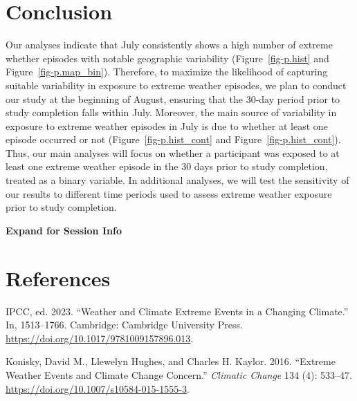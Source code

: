 \documentclass[
  letterpaper,
  DIV=11,
  numbers=noendperiod]{scrartcl}
\newlength{\cslhangindent}
\newenvironment{CSLReferences}[2] %
 {\begin{list}{}{%
  \setlength{\itemindent}{0pt}
  \setlength{\leftmargin}{0pt}
  \setlength{\parsep}{0pt}
  \ifodd #1
   \setlength{\leftmargin}{\cslhangindent}
   \setlength{\itemindent}{-1\cslhangindent}
  \fi
  \setlength{\itemsep}{#2\baselineskip}}}
 {\end{list}}
\begin{document}
\section{Conclusion}\label{conclusion}

Our analyses indicate that July consistently shows a high number of
extreme whether episodes with notable geographic variability
(Figure~\ref{fig-p.hist} and Figure~\ref{fig-p.map_bin}). Therefore, to
maximize the likelihood of capturing suitable variability in exposure to
extreme weather episodes, we plan to conduct our study at the beginning
of August, ensuring that the 30-day period prior to study completion
falls within July. Moreover, the main source of variability in exposure
to extreme weather episodes in July is due to whether at least one
episode occurred or not (Figure~\ref{fig-p.hist_cont} and
Figure~\ref{fig-p.hist_cont}). Thus, our main analyses will focus on
whether a participant was exposed to at least one extreme weather
episode in the 30 days prior to study completion, treated as a binary
variable. In additional analyses, we will test the sensitivity of our
results to different time periods used to assess extreme weather
exposure prior to study completion.

\begin{tcolorbox}[enhanced jigsaw, left=2mm, colback=white, leftrule=.75mm, opacityback=0, breakable, toprule=.15mm, arc=.35mm, bottomrule=.15mm, rightrule=.15mm, colframe=quarto-callout-note-color-frame]
\begin{minipage}[t]{5.5mm}
\textcolor{quarto-callout-note-color}{\faInfo}
\end{minipage}%
\begin{minipage}[t]{\textwidth - 5.5mm}

\vspace{-3mm}\textbf{Expand for Session Info}\vspace{3mm}

\end{minipage}%
\end{tcolorbox}

\section*{References}\label{references}

\label{refs}
\begin{CSLReferences}{1}{0}
IPCC, ed. 2023. {``Weather and Climate Extreme Events in a Changing
Climate.''} In, 1513--1766. Cambridge: Cambridge University Press.
\url{https://doi.org/10.1017/9781009157896.013}.

Konisky, David M., Llewelyn Hughes, and Charles H. Kaylor. 2016.
{``Extreme Weather Events and Climate Change Concern.''} \emph{Climatic
Change} 134 (4): 533--47.
\url{https://doi.org/10.1007/s10584-015-1555-3}.

\end{CSLReferences}
\end{document}
